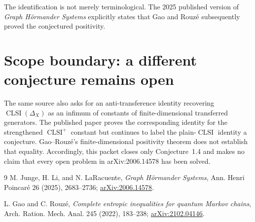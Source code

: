 \documentclass[10pt]{article}
\begin{document}
The identification is not merely terminological.  The 2025 published
version of \emph{Graph H\"ormander Systems} explicitly states that Gao and
Rouz\'e subsequently proved the conjectured positivity.

\section*{Scope boundary: a different conjecture remains open}
The same source also asks for an anti-transference identity recovering
$\operatorname{CLSI}(\Delta_X)$ as an infimum of constants of
finite-dimensional transferred generators.  The published paper proves the
corresponding identity for the strengthened $\operatorname{CLSI}^{+}$
constant but continues to label the plain-$\operatorname{CLSI}$ identity a
conjecture.  Gao--Rouz\'e's finite-dimensional positivity theorem does not
establish that equality.  Accordingly, this packet closes only
Conjecture~1.4 and makes no claim that every open problem in arXiv:2006.14578
has been solved.

\begin{thebibliography}{9}
M. Junge, H. Li, and N. LaRacuente,
\emph{Graph H\"ormander Systems},
Ann. Henri Poincar\'e 26 (2025), 2683--2736;
\href{https://arxiv.org/abs/2006.14578}{arXiv:2006.14578}.

L. Gao and C. Rouz\'e,
\emph{Complete entropic inequalities for quantum Markov chains},
Arch. Ration. Mech. Anal. 245 (2022), 183--238;
\href{https://arxiv.org/abs/2102.04146}{arXiv:2102.04146}.
\end{thebibliography}
\end{document}
